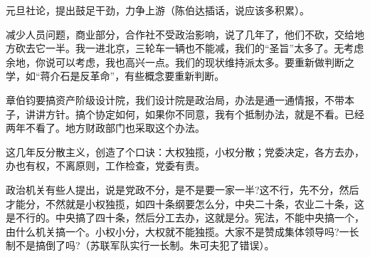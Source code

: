 元旦社论，提出鼓足干劲，力争上游（陈伯达插话，说应该多积累）。

减少人员问题，商业部分，合作社不受政治影响，说了几年了，他们不砍，交给地方砍去它一半。我一进北京，三轮车一辆也不能减，我们的“圣旨”太多了。无考虑余地，你说可以考虑，我也高兴一点。我们的现状维持派太多。要重新做判断之学，如“蒋介石是反革命”，有些概念要重新判断。

章伯钧要搞资产阶级设计院，我们设计院是政治局，办法是通一通情报，不带本子，讲讲方针。搞个协定如何，如果你不同意，我有个抵制办法，就是不看。已经两年不看了。地方财政部门也采取这个办法。

这几年反分散主义，创造了个口诀：大权独揽，小权分散；党委决定，各方去办，办也有权，不离原则，工作检查，党委有责。

政治机关有些人提出，说是党政不分，是不是要一家一半?这不行，先不分，然后才能分，不然就是小权独揽，如四十条纲要怎么分，中央二十条，农业二十条，这是不行的。中央搞了四十条，然后分工去办，这就是分。宪法，不能中央搞一个，由什么机关搞一个。小权小分，大权就不能独揽。大家不是赞成集体领导吗?一长制不是搞倒了吗?（苏联军队实行一长制。朱可夫犯了错误）。

